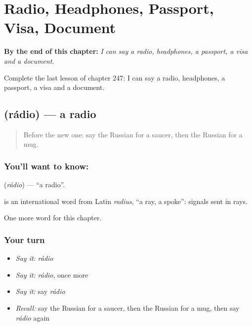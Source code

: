 
\chapter{Radio, Headphones, Passport, Visa, Document}
\label{ch:ru-radio-headphones-passport-visa-document}

\begin{chapteropening}
\textbf{By the end of this chapter:} \emph{I can say a radio, headphones, a passport, a visa and a document.}

Complete the last lesson of chapter 247: I can say a radio, headphones, a passport, a visa and a document.
\end{chapteropening}

\section[\texorpdfstring{\ru{радио} (rádio)}{радио (rádio)}]{ (rádio) — a radio}

\label{lesson:RU-C247-radio}



\begin{quote}
Before the new one: say the Russian for a saucer, then the Russian for a mug.
\end{quote}

\subsection*{You'll want to know: }
\textbf{} (\emph{rádio}) — \textquotedblleft{}a radio\textquotedblright{}.

\begin{cousinweb}
\textbf{} is an international word from Latin \emph{radius}, \textquotedblleft{}a ray, a spoke\textquotedblright{}: signals sent in rays.
\end{cousinweb}

\begin{grammarlens}[title={What you've built}]
One more word for this chapter.
\end{grammarlens}

\subsection*{Your turn}
\begin{itemize}
\raggedright
  \item \emph{Say it:} \emph{rádio}
  \item \emph{Say it:} \emph{rádio}, once more
  \item \emph{Say it:} say \emph{rádio}
  \item \emph{Recall:} say the Russian for a saucer, then the Russian for a mug, then say \emph{rádio} again
\end{itemize}

